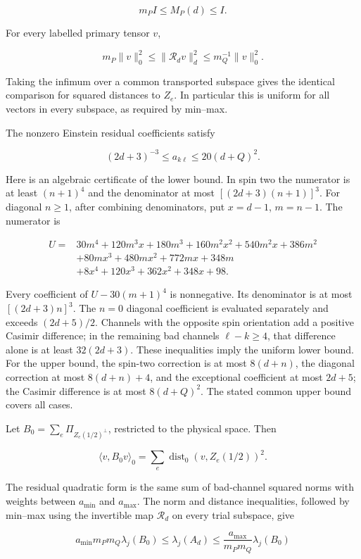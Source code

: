 \documentclass[a4paper,11pt]{article}
\numberwithin{equation}{section}
\begin{document}
\[
m_PI\leq M_P(d)\leq I.
\]

For every labelled primary tensor \(v\),

\[
m_P\|v\|_0^2\leq\|\mathcal R_dv\|_d^2
\leq m_Q^{-1}\|v\|_0^2.
\]

Taking the infimum over a common transported subspace gives the identical comparison for squared distances to \(Z_e\). In particular this is uniform for all vectors in every subspace, as required by min--max.

The nonzero Einstein residual coefficients satisfy

\[
(2d+3)^{-3}\leq a_{k\ell}\leq20(d+Q)^2.
\]

Here is an algebraic certificate of the lower bound. In spin two the numerator is at least \((n+1)^4\) and the denominator at most \([(2d+3)(n+1)]^3\). For diagonal \(n\geq1\), after combining denominators, put \(x=d-1\), \(m=n-1\). The numerator is

\[
\begin{aligned}
U={}&30m^4+120m^3x+180m^3+160m^2x^2+540m^2x+386m^2\\
&+80mx^3+480mx^2+772mx+348m\\
&+8x^4+120x^3+362x^2+348x+98.
\end{aligned}
\]

Every coefficient of \(U-30(m+1)^4\) is nonnegative. Its denominator is at most \([(2d+3)n]^3\). The \(n=0\) diagonal coefficient is evaluated separately and exceeds \((2d+5)/2\). Channels with the opposite spin orientation add a positive Casimir difference; in the remaining bad channels \(\ell-k\geq4\), that difference alone is at least \(32(2d+3)\). These inequalities imply the uniform lower bound. For the upper bound, the spin-two correction is at most \(8(d+n)\), the diagonal correction at most \(8(d+n)+4\), and the exceptional coefficient at most \(2d+5\); the Casimir difference is at most \(8(d+Q)^2\). The stated common upper bound covers all cases.

Let \(B_0=\sum_e\Pi_{Z_e(1/2)^\perp}\), restricted to the physical space. Then

\[
\langle v,B_0v\rangle_0=\sum_e\operatorname{dist}_0(v,Z_e(1/2))^2.
\]

The residual quadratic form is the same sum of bad-channel squared norms with weights between \(a_{\min}\) and \(a_{\max}\). The norm and distance inequalities, followed by min--max using the invertible map \(\mathcal R_d\) on every trial subspace, give

\[
a_{\min}m_Pm_Q\lambda_j(B_0)
\leq\lambda_j(A_d)
\leq\frac{a_{\max}}{m_Pm_Q}\lambda_j(B_0)
\]
\end{document}
